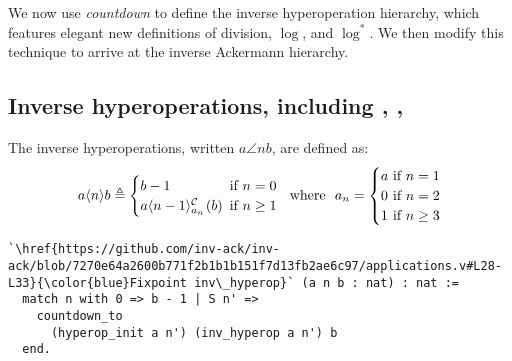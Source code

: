 We now use \emph{countdown} to define the inverse
hyperoperation hierarchy, which features elegant new definitions of
division, $\log$, and $\log^{*}$.
We then modify this technique to arrive at the inverse
Ackermann hierarchy.

\subsection{Inverse hyperoperations, including , , }

\begin{defn} \label{defn: inv-hyperop}
	The inverse hyperoperations, written $a\angle{n}b$, are defined as:
	\begin{equation}
  a\angle{n}b \triangleq \begin{cases}
  b - 1 & \hspace{-5pt}\text{if } n = 0 \\
  \cdt{a\angle{n-1}}{a_n}(b) & \hspace{-5pt}\text{if } n \ge 1
  \end{cases}
   \ \text{ where } \ a_n = \begin{cases}
   a & \hspace{-10pt}\text{ if } n = 1 \\
   0 & \hspace{-10pt}\text{ if } n = 2 \\
  1 & \hspace{-10pt}\text{ if } n \ge 3
  \end{cases}
\end{equation}
\begin{lstlisting}
`\href{https://github.com/inv-ack/inv-ack/blob/7270e64a2600b771f2b1b1b151f7d13fb2ae6c97/applications.v#L28-L33}{\color{blue}Fixpoint inv\_hyperop}` (a n b : nat) : nat :=
  match n with 0 => b - 1 | S n' =>
    countdown_to
      (hyperop_init a n') (inv_hyperop a n') b
  end.
\end{lstlisting}
\end{defn}
